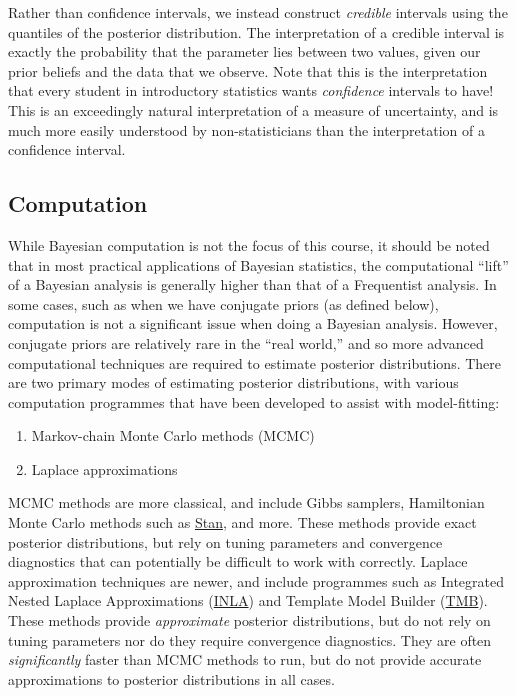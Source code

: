 \documentclass[
  letterpaper,
  DIV=11,
  numbers=noendperiod]{scrreprt}
\begin{document}
Rather than confidence intervals, we instead construct \emph{credible}
intervals using the quantiles of the posterior distribution. The
interpretation of a credible interval is exactly the probability that
the parameter lies between two values, given our prior beliefs and the
data that we observe. Note that this is the interpretation that every
student in introductory statistics wants \emph{confidence} intervals to
have! This is an exceedingly natural interpretation of a measure of
uncertainty, and is much more easily understood by non-statisticians
than the interpretation of a confidence interval.

\subsection*{Computation}\label{computation}

While Bayesian computation is not the focus of this course, it should be
noted that in most practical applications of Bayesian statistics, the
computational ``lift'' of a Bayesian analysis is generally higher than
that of a Frequentist analysis. In some cases, such as when we have
conjugate priors (as defined below), computation is not a significant
issue when doing a Bayesian analysis. However, conjugate priors are
relatively rare in the ``real world,'' and so more advanced
computational techniques are required to estimate posterior
distributions. There are two primary modes of estimating posterior
distributions, with various computation programmes that have been
developed to assist with model-fitting:

\begin{enumerate}
\def\labelenumi{\arabic{enumi}.}
\item
  Markov-chain Monte Carlo methods (MCMC)
\item
  Laplace approximations
\end{enumerate}

MCMC methods are more classical, and include Gibbs samplers, Hamiltonian
Monte Carlo methods such as \href{https://mc-stan.org/}{Stan}, and more.
These methods provide exact posterior distributions, but rely on tuning
parameters and convergence diagnostics that can potentially be difficult
to work with correctly. Laplace approximation techniques are newer, and
include programmes such as Integrated Nested Laplace Approximations
(\href{https://www.r-inla.org/}{INLA}) and Template Model Builder
(\href{https://kaskr.github.io/adcomp/Introduction.html}{TMB}). These
methods provide \emph{approximate} posterior distributions, but do not
rely on tuning parameters nor do they require convergence diagnostics.
They are often \emph{significantly} faster than MCMC methods to run, but
do not provide accurate approximations to posterior distributions in all
cases.
\end{document}
